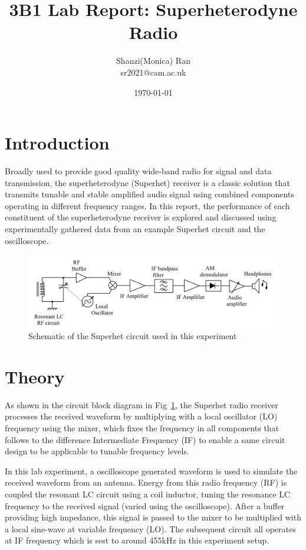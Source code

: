 \documentclass[a4paper,12pt]{article}
\begin{document}
\title{\Large \textbf{3B1 Lab Report: Superheterodyne Radio}}
\author{Shanzi(Monica) Ran\\
sr2021@cam.ac.uk}
\date{\small \today}
\maketitle

\section{Introduction}
Broadly used to provide good quality wide-band radio for signal and data transmission, 
the superheterodyne (Superhet) receiver is a classic solution that transmits tunable and stable amplified audio signal using combined components operating in different frequency ranges.
In this report, the performance of each constituent of the superheterodyne receiver is explored and discussed using experimentally gathered data from an example Superhet circuit and the oscilloscope.

\begin{figure}[h]
    \centering
    \includegraphics[width=1\textwidth]{schematic}
    \caption{Schematic of the Superhet circuit used in this experiment}
    \label{fig:schematic}
\end{figure}
\vspace{-1.5em}

\section{Theory}
As shown in the circuit block diagram in Fig~\ref{fig:schematic}, the Superhet radio receiver processes the received waveform by multiplying with a local oscillator (LO) frequency using the mixer, which fixes the frequency in all components that follows to the difference Intermediate Frequency (IF) to enable a same circuit design to be applicable to tunable frequency levels.

In this lab experiment, a oscilloscope generated waveform is used to simulate the received waveform from an antenna. Energy from this radio frequency (RF) is coupled the resonant LC circuit using a coil inductor, tuning the resonance LC frequency to the received signal (varied using the oscilloscope).
After a buffer providing high impedance, this signal is passed to the mixer to be multiplied with a local sine-wave at variable frequency (LO). The subsequent circuit all operates at IF frequency which is sest to around 455kHz in this experiment setup.
\end{document}
